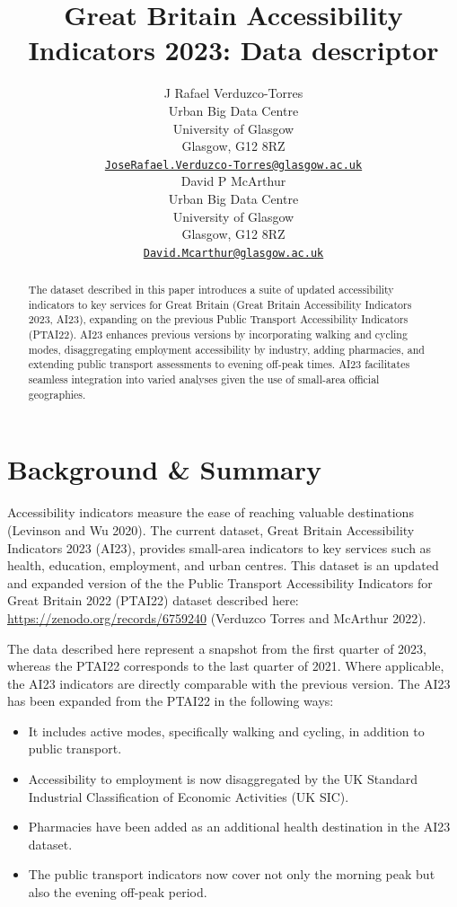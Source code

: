 \documentclass{article}
\title{Great Britain Accessibility Indicators 2023: Data descriptor}
\author{
    J Rafael Verduzco-Torres
   \\
    Urban Big Data Centre \\
    University of Glasgow \\
  Glasgow, G12 8RZ \\
  \texttt{\href{mailto:JoseRafael.Verduzco-Torres@glasgow.ac.uk}{\nolinkurl{JoseRafael.Verduzco-Torres@glasgow.ac.uk}}} \\
   \And
    David P McArthur
   \\
    Urban Big Data Centre \\
    University of Glasgow \\
  Glasgow, G12 8RZ \\
  \texttt{\href{mailto:David.Mcarthur@glasgow.ac.uk}{\nolinkurl{David.Mcarthur@glasgow.ac.uk}}} \\
  }
\providecommand{\tightlist}{%
  \setlength{\itemsep}{0pt}\setlength{\parskip}{0pt}}
\begin{document}
\maketitle


\begin{abstract}
The dataset described in this paper introduces a suite of updated
accessibility indicators to key services for Great Britain (Great
Britain Accessibility Indicators 2023, AI23), expanding on the previous
Public Transport Accessibility Indicators (PTAI22). AI23 enhances
previous versions by incorporating walking and cycling modes,
disaggregating employment accessibility by industry, adding pharmacies,
and extending public transport assessments to evening off-peak times.
AI23 facilitates seamless integration into varied analyses given the use
of small-area official geographies.
\end{abstract}


\hypertarget{background-summary}{%
\section{Background \& Summary}\label{background-summary}}

Accessibility indicators measure the ease of reaching valuable
destinations (Levinson and Wu 2020). The current dataset, Great Britain
Accessibility Indicators 2023 (AI23), provides small-area indicators to
key services such as health, education, employment, and urban centres.
This dataset is an updated and expanded version of the the Public
Transport Accessibility Indicators for Great Britain 2022 (PTAI22)
dataset described here: \url{https://zenodo.org/records/6759240}
(Verduzco Torres and McArthur 2022).

The data described here represent a snapshot from the first quarter of
2023, whereas the PTAI22 corresponds to the last quarter of 2021. Where
applicable, the AI23 indicators are directly comparable with the
previous version. The AI23 has been expanded from the PTAI22 in the
following ways:

\begin{itemize}
\tightlist
\item
  It includes active modes, specifically walking and cycling, in
  addition to public transport.
\item
  Accessibility to employment is now disaggregated by the UK Standard
  Industrial Classification of Economic Activities (UK SIC).
\item
  Pharmacies have been added as an additional health destination in the
  AI23 dataset.
\item
  The public transport indicators now cover not only the morning peak
  but also the evening off-peak period.
\end{itemize}
\end{document}
